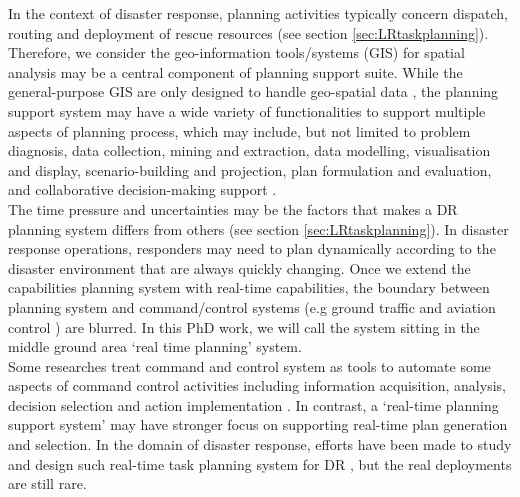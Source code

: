In the context of disaster response, planning activities  typically concern dispatch, routing and deployment of rescue resources (see section \ref{sec:LRtaskplanning}). Therefore, we consider the geo-information tools/systems (GIS) for spatial analysis may be a central component of planning support suite. While the general-purpose GIS  are only designed to handle geo-spatial data \cite{Geertman2004}, the planning support system may have a wide variety of functionalities to support multiple aspects of planning process, which may include, but not limited to problem diagnosis, data collection, mining and extraction, data modelling, visualisation and display, scenario-building and projection, plan formulation and evaluation, and collaborative decision-making support \cite{Geertman2004}. \\

The time pressure and uncertainties may be the factors that makes a DR planning system differs from others (see section \ref{sec:LRtaskplanning}). In disaster response operations, responders may need to plan dynamically according to the disaster environment that are always quickly changing. Once we extend the capabilities planning system with real-time capabilities, the boundary between planning system and command/control systems (e.g ground traffic and aviation control \cite{Sharples2011}) are blurred. In this PhD work, we will call the system sitting in the middle ground area `real time planning' system.\\

Some researches treat command and control system as tools to automate some aspects of command control activities including information acquisition, analysis, decision selection and action implementation \cite{Sharples2011}.  In contrast, a `real-time planning support system' may have stronger focus on supporting real-time plan generation and selection. In the domain of disaster response, efforts have been made to study and design such real-time task planning system for DR \cite{Wagner2004,Okaya}, but the real deployments are still rare.\\

